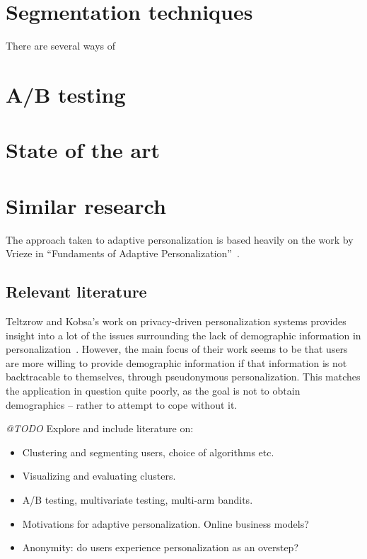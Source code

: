 \section{Segmentation techniques}
\label{survey:sec:segmentation_techniques}

There are several ways of

\section{A/B testing}
\label{survey:sec:ab_testing}


\section{State of the art}
\label{survey:sub:state_of_the_art}


\section{Similar research} %
\label{survey:sec:similar_applications}

The approach taken to adaptive personalization is based heavily on the work by Vrieze in ``Fundaments of Adaptive Personalization''~\cite{Vrieze}.

\subsection{Relevant literature} %
\label{survey:sec:relevant_literature}

Teltzrow and Kobsa's work on privacy-driven personalization systems provides insight into a lot of the issues surrounding the lack of demographic information in personalization~\cite{Teltzrow2004,Kobsa2007}. However, the main focus of their work seems to be that users are more willing to provide demographic information if that information is not backtracable to themselves, through pseudonymous personalization.
This matches the application in question quite poorly, as the goal is not to obtain demographics -- rather to attempt to cope without it.

\emph{@TODO} Explore and include literature on:

\begin{itemize}
  \item Clustering and segmenting users, choice of algorithms etc.
  \item Visualizing and evaluating clusters.
  \item A/B testing, multivariate testing, multi-arm bandits.
  \item Motivations for adaptive personalization. Online business models?
  \item Anonymity: do users experience personalization as an overstep?
\end{itemize}


